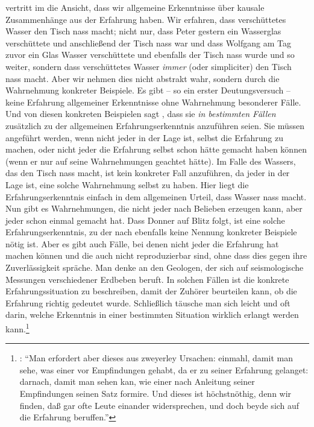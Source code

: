  vertritt im  die Ansicht,
dass wir allgemeine Erkenntnisse über kausale Zusammenhänge aus der Erfahrung haben. Wir erfahren, dass verschüttetes
Wasser den Tisch nass macht; nicht nur, dass Peter gestern ein Wasserglas
verschüttete und anschließend der Tisch nass war und dass Wolfgang am Tag zuvor
ein Glas Wasser verschüttete und ebenfalls der Tisch nass wurde und so weiter,
sondern dass verschüttetes Wasser \emph{immer} (oder simpliciter) den Tisch nass
macht. Aber wir nehmen dies nicht abstrakt wahr, sondern durch die Wahrnehmung
konkreter Beispiele. Es gibt -- so ein erster Deutungsversuch -- keine Erfahrung
allgemeiner Erkenntnisse ohne Wahrnehmung besonderer Fälle. Und von diesen konkreten Beispielen sagt
, dass sie \emph{in bestimmten Fällen} zusätzlich zu der allgemeinen
Erfahrungserkenntnis anzuführen seien. Sie müssen angeführt werden, wenn nicht
jeder in der Lage ist, selbst die Erfahrung zu machen, oder nicht jeder die
Erfahrung selbst schon hätte gemacht haben können (wenn er nur auf seine
Wahrnehmungen geachtet hätte). Im Falle des Wassers, das den Tisch nass macht, ist kein
konkreter Fall anzuführen, da jeder in der Lage ist, eine solche Wahrnehmung
selbst zu haben. Hier liegt die Erfahrungserkenntnis einfach in dem allgemeinen
Urteil, dass Wasser nass macht. Nun gibt es Wahrnehmungen, die nicht jeder nach
Belieben erzeugen kann, aber jeder schon einmal gemacht hat. Dass Donner auf
Blitz folgt, ist eine solche Erfahrungserkenntnis, zu der nach 
ebenfalls keine Nennung konkreter Beispiele nötig ist. Aber es gibt auch Fälle,
bei denen nicht jeder die Erfahrung hat machen können und die auch nicht
reproduzierbar sind, ohne dass dies gegen ihre Zuverlässigkeit spräche. Man
denke an den Geologen, der sich auf seismologische Messungen verschiedener
Erdbeben beruft.
In solchen Fällen ist die konkrete Erfahrungssituation zu beschreiben, damit der
Zuhörer beurteilen kann, ob die Erfahrung richtig gedeutet wurde. Schließlich
täusche man sich leicht und oft darin, welche Erkenntnis in einer bestimmten
Situation wirklich erlangt werden kann.\footnote{\cite[Vgl.][Capitel 5,
\S~2]{Wolff:VernuenftigeGedankenvondenKraeftendesmenschlichenVerstandesundihremrichtigenGebraucheinErkenntnisderWahrheit1978}:
\enquote{Man erfordert aber dieses aus zweyerley Ursachen: einmahl, damit man
sehe, was einer vor Empfindungen gehabt, da er zu seiner Erfahrung gelanget:
darnach, damit man sehen kan, wie einer nach Anleitung seiner Empfindungen
seinen Satz formire. Und dieses ist höchstnöthig, denn wir finden, daß gar ofte
Leute einander widersprechen, und doch beyde sich auf die Erfahrung beruffen.}}

